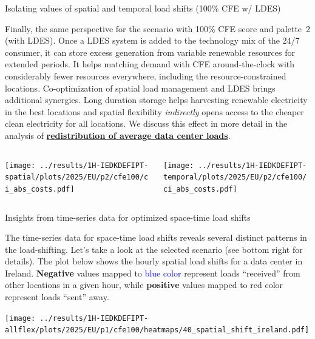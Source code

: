 \begin{frame}{Isolating values of spatial and temporal load shifts (100\% CFE w/ LDES)}
\label{isolated-p2}

  {\footnotesize

  Finally, the same perspective for the scenario with \alert{100\% CFE score and palette~2 (with LDES)}. 
  Once a LDES system is added to the technology mix of the 24/7 consumer, it 
  can store excess generation from variable renewable resources for extended periods. It helps matching demand with CFE around-the-clock with considerably fewer resources everywhere, including the resource-constrained locations. Co-optimization of spatial load management and LDES brings additional synergies. Long duration storage helps harvesting renewable electricity in the best locations and spatial flexibility \textit{indirectly} opens access to the cheaper clean electricity for all locations. We discuss this effect in more detail in the analysis of {\bf \hyperlink{redistribution-p2}{redistribution of average data center loads}}.

  \begin{columns}
    \begin{column}{7cm}
    \texttt{[image: ../results/1H-IEDKDEFIPT-spatial/plots/2025/EU/p2/cfe100/ci\_abs\_costs.pdf]}
    \end{column}
    
    \begin{column}{7cm}
    \texttt{[image: ../results/1H-IEDKDEFIPT-temporal/plots/2025/EU/p2/cfe100/ci\_abs\_costs.pdf]}
    \end{column}
  \end{columns}

  }
\end{frame}




\begin{frame}{Insights from time-series data for optimized space-time load shifts}

  {\footnotesize

  The time-series data for space-time load shifts reveals several distinct patterns in the load-shifting. Let's take a look at the selected scenario (see bottom right for details). The plot below shows \alert{ the hourly spatial load shifts} for a data center in Ireland. {\bf Negative} values mapped to \textcolor{blue}{blue color} represent loads \enquote{received} from other locations in a given hour, while {\bf positive} values mapped to \textcolor{TUred}{red color} represent loads \enquote{sent} away. 

  \texttt{[image: ../results/1H-IEDKDEFIPT-allflex/plots/2025/EU/p1/cfe100/heatmaps/40\_spatial\_shift\_ireland.pdf]}
  \vspace{0.3cm}

  }
  
\end{frame}


